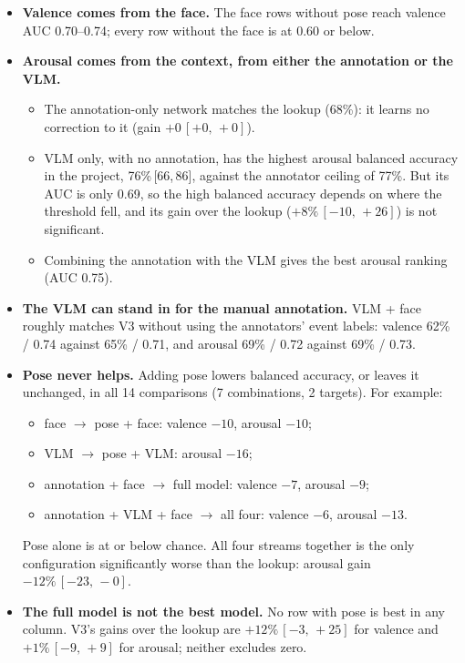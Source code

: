 \documentclass[11pt]{article}
\newcommand{\ci}[2]{\,[#1,\,#2]}
\begin{document}
\begin{itemize}
  \item \textbf{Valence comes from the face.} The face rows without pose reach valence AUC 0.70--0.74; every row without the face is at 0.60 or below.
  \item \textbf{Arousal comes from the context, from either the annotation or the VLM.}
  \begin{itemize}
    \item The annotation-only network matches the lookup (68\%): it learns no correction to it (gain $+0\ci{+0}{+0}$).
    \item VLM only, with no annotation, has the highest arousal balanced accuracy in the project, 76\%\ci{66}{86}, against the annotator ceiling of 77\%. But its AUC is only 0.69, so the high balanced accuracy depends on where the threshold fell, and its gain over the lookup ($+8\%\ci{-10}{+26}$) is not significant.
    \item Combining the annotation with the VLM gives the best arousal ranking (AUC 0.75).
  \end{itemize}
  \item \textbf{The VLM can stand in for the manual annotation.} VLM + face roughly matches V3 without using the annotators' event labels: valence 62\% / 0.74 against 65\% / 0.71, and arousal 69\% / 0.72 against 69\% / 0.73.
  \item \textbf{Pose never helps.} Adding pose lowers balanced accuracy, or leaves it unchanged, in all 14 comparisons (7 combinations, 2 targets). For example:
  \begin{itemize}
    \item face $\to$ pose + face: valence $-10$, arousal $-10$;
    \item VLM $\to$ pose + VLM: arousal $-16$;
    \item annotation + face $\to$ full model: valence $-7$, arousal $-9$;
    \item annotation + VLM + face $\to$ all four: valence $-6$, arousal $-13$.
  \end{itemize}
  Pose alone is at or below chance. All four streams together is the only configuration significantly worse than the lookup: arousal gain $-12\%\ci{-23}{-0}$.
  \item \textbf{The full model is not the best model.} No row with pose is best in any column. V3's gains over the lookup are $+12\%\ci{-3}{+25}$ for valence and $+1\%\ci{-9}{+9}$ for arousal; neither excludes zero.
\end{itemize}
\end{document}
